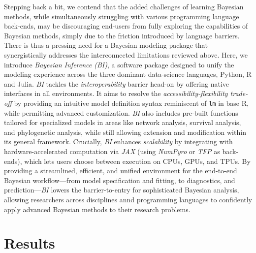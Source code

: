 \documentclass[num-refs]{wiley-article}
\begin{document}
Stepping back a bit, we contend that the added challenges of learning Bayesian methods, while simultaneously struggling with various programming language back-ends, may be discouraging end-users from fully exploring the capabilities of Bayesian methods, simply due to the friction introduced by language barriers. There is thus a pressing need for a Bayesian modeling package that synergistically addresses the interconnected limitations reviewed above. Here, we introduce \textit{Bayesian Inference (BI)}, a software package designed to unify the modeling experience across the three dominant data-science languages, Python, R and Julia. \textit{BI} tackles the \textit{interoperability} barrier head-on by offering native interfaces in all environments. It aims to resolve the \textit{accessibility-flexibility trade-off} by providing an intuitive model definition syntax reminiscent of \texttt{lm} in base R, while permitting advanced customization. \textit{BI} also includes pre-built functions tailored for specialized models in areas like network analysis, survival analysis, and phylogenetic analysis, while still allowing extension and modification within its general framework. Crucially, \textit{BI} enhances \textit{scalability} by integrating with hardware-accelerated computation via \textit{JAX} (using \textit{NumPyro} or \textit{TFP} as back-ends), which lets users choose between execution on CPUs, GPUs, and TPUs. By providing a streamlined, efficient, and unified environment for the end-to-end Bayesian workflow---from model specification and fitting, to diagnostics, and prediction---\textit{BI} lowers the barrier-to-entry for sophisticated Bayesian analysis, allowing researchers across disciplines annd programming languages to confidently apply advanced Bayesian methods to their research problems.


\section{Results}\label{results}
\end{document}
